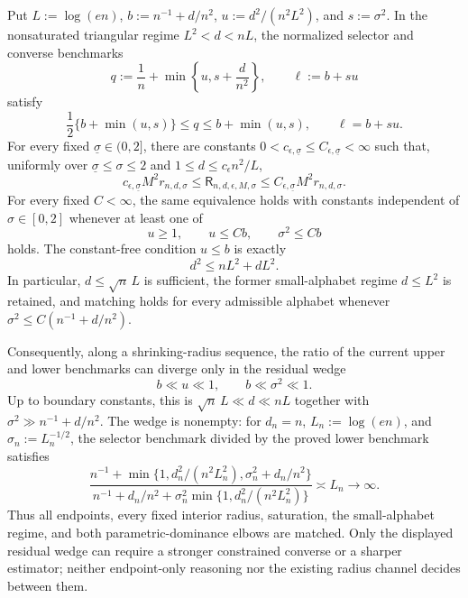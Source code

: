 Put \(L:=\log(en)\), \(b:=n^{-1}+d/n^2\), \(u:=d^2/(n^2L^2)\), and \(s:=\sigma^2\).  In the nonsaturated triangular regime \(L^2<d<nL\), the normalized selector and converse benchmarks
\[
 q:=\frac1n+\min\left\{u,s+\frac d{n^2}\right\},
 \qquad
 \ell:=b+su
\]
satisfy
\[
 \frac12\{b+\min(u,s)\}\le q\le b+\min(u,s),
 \qquad \ell=b+su.
\]
For every fixed \(\underline\sigma\in(0,2]\), there are constants \(0<c_{\epsilon,\underline\sigma}\le C_{\epsilon,\underline\sigma}<\infty\) such that, uniformly over \(\underline\sigma\le\sigma\le2\) and \(1\le d\le c_{\epsilon}n^2/L\),
\[
 c_{\epsilon,\underline\sigma}M^2r_{n,d,\sigma}
 \le \mathsf R_{n,d,\epsilon,M,\sigma}
 \le C_{\epsilon,\underline\sigma}M^2r_{n,d,\sigma}.
\]
For every fixed \(C<\infty\), the same equivalence holds with constants independent of \(\sigma\in[0,2]\) whenever at least one of
\[
 u\ge1,
 \qquad u\le Cb,
 \qquad \sigma^2\le Cb
\]
holds.  The constant-free condition \(u\le b\) is exactly
\[
 d^2\le nL^2+dL^2.
\]
In particular, \(d\le\sqrt n\,L\) is sufficient, the former small-alphabet regime \(d\le L^2\) is retained, and matching holds for every admissible alphabet whenever \(\sigma^2\le C(n^{-1}+d/n^2)\).

Consequently, along a shrinking-radius sequence, the ratio of the current upper and lower benchmarks can diverge only in the residual wedge
\[
 b\ll u\ll1,
 \qquad
 b\ll\sigma^2\ll1.
\]
Up to boundary constants, this is \(\sqrt n\,L\ll d\ll nL\) together with \(\sigma^2\gg n^{-1}+d/n^2\).  The wedge is nonempty: for \(d_n=n\), \(L_n:=\log(en)\), and \(\sigma_n:=L_n^{-1/2}\), the selector benchmark divided by the proved lower benchmark satisfies
\[
 \frac{n^{-1}+\min\{1,d_n^2/(n^2L_n^2),\sigma_n^2+d_n/n^2\}}
 {n^{-1}+d_n/n^2+\sigma_n^2\min\{1,d_n^2/(n^2L_n^2)\}}
 \asymp L_n\longrightarrow\infty.
\]
Thus all endpoints, every fixed interior radius, saturation, the small-alphabet regime, and both parametric-dominance elbows are matched.  Only the displayed residual wedge can require a stronger constrained converse or a sharper estimator; neither endpoint-only reasoning nor the existing radius channel decides between them.